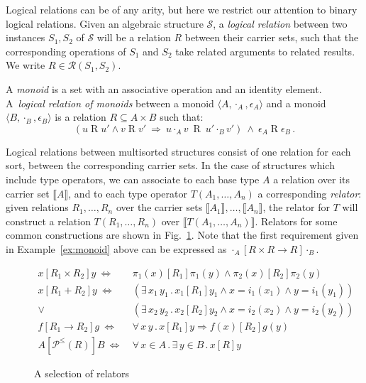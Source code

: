 \documentclass[sigplan,10pt,review,anonymous]{acmart}
\newcommand{\ifr}[1]{\mathrel{[{#1}]}}
\begin{document}
Logical relations can be of any arity,
but here
we restrict our attention to
binary logical relations.
Given an algebraic structure $\mathcal{S}$,
a \emph{logical relation}
between two instances $S_1, S_2$ of $\mathcal{S}$
will be a relation $R$
between their carrier sets,
such that the corresponding operations of $S_1$ and $S_2$
take related arguments to related results.
We write $R \in \mathcal{R}(S_1, S_2)$.

\begin{example}
\label{ex:monoid}
A \emph{monoid} is a set with
an associative operation and
an identity element.
A~\emph{logical relation of monoids} between
a monoid $\langle A, \cdot_A, \epsilon_A \rangle$ and
a monoid $\langle B, \cdot_B, \epsilon_B \rangle$
is a relation $R \subseteq A \times B$
such that:
\[
(u \mathrel{R} u' \wedge v \mathrel{R} v' \: \Rightarrow \:
 u \cdot_A v \: \mathrel{R} \: u' \cdot_B v')
\: \wedge \:
\epsilon_A \mathrel{R} \epsilon_B \,.
\]
\end{example}

Logical relations between multisorted structures
consist of one relation for each sort,
between the corresponding carrier sets.
In the case of structures which include type operators,
we can associate to each base type $A$
a relation over its carrier set $\llbracket A \rrbracket$,
and to each type operator $T(A_1, \ldots, A_n)$
a corresponding \emph{relator}:
given relations $R_1, \ldots, R_n$ over
the carrier sets $\llbracket A_1 \rrbracket, \ldots, \llbracket A_n \rrbracket$,
the relator for $T$
will construct a relation $T(R_1, \ldots, R_n)$
over $\llbracket T(A_1, \ldots, A_n) \rrbracket$.
Relators for some common constructions are shown in Fig.~\ref{fig:relators}.
Note that the first requirement given in Example~\ref{ex:monoid} above
can be expressed as
$
  \cdot_A \ifr{R \times R \rightarrow R} \cdot_B
$.

\begin{figure} %
  {\small
  \begin{align*}
    x \ifr{R_1 \times R_2} y \ \Leftrightarrow\  &
      \pi_1(x) \ifr{R_1} \pi_1(y) \wedge
      \pi_2(x) \ifr{R_2} \pi_2(y) \\
    x \ifr{R_1 + R_2} y \ \Leftrightarrow\  &
      (\exists \, x_1 \, y_1 \,.\,
        x_1 \ifr{R_1} y_1 \wedge
        x = i_1(x_1) \wedge
        y = i_1(y_1)) \\ \vee\ &
      (\exists \, x_2 \, y_2 \,.\,
        x_2 \ifr{R_2} y_2 \wedge
        x = i_2(x_2) \wedge
        y = i_2(y_2)) \\
    f \ifr{R_1 \rightarrow R_2} g \ \Leftrightarrow\  &
      \forall \, x \, y \,.\,
        x \ifr{R_1} y \Rightarrow
        f(x) \ifr{R_2} g(y) \\
    A \ifr{\mathcal{P}^\le(R)} B \ \Leftrightarrow\  &
      \forall \, x \in A \,.\,
      \exists \, y \in B \,.\,
      x \ifr{R} y
  \end{align*}
  }%
  \caption{A selection of relators}
  \label{fig:relators}
\end{figure}
\end{document}
